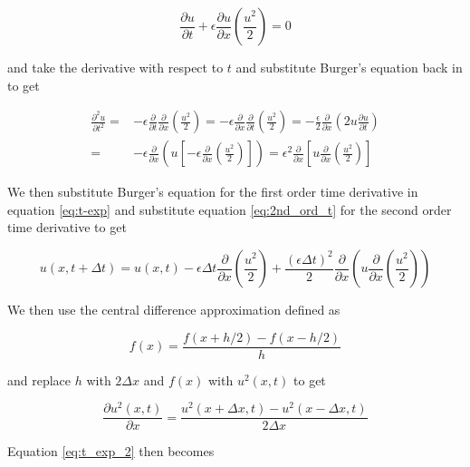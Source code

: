 \documentclass{article}
\begin{document}
\begin{equation}
	\frac{\partial u}{\partial t}+\epsilon \frac{\partial u}{\partial x} \left(\frac{u^2}{2}\right) = 0
\end{equation}

and take the derivative with respect to $t$  and substitute Burger's equation back in to get

\begin{equation}
\begin{split}
	\label{eq:2nd_ord_t}
	\frac{\partial^2 u }{\partial t^2} =& - \epsilon \frac{\partial }{\partial t}\frac{\partial }{\partial x} \left(\frac{u^2}{2} \right)
	= - \epsilon \frac{\partial }{\partial x}\frac{\partial }{\partial t} \left(\frac{u^2}{2} \right)
	= - \frac{\epsilon}{2} \frac{\partial }{\partial x}\left( 2u\frac{\partial u}{\partial t} \right)
	\\ =& - \epsilon \frac{\partial }{\partial x} \left( u \left[ -\epsilon \frac{\partial }{\partial x} \left(\frac{u^2}{2} \right) \right] \right)
	= \epsilon^2 \frac{\partial}{\partial x} \left[u \frac{\partial}{\partial x}\left( \frac{u^2}{2}\right) \right]
\end{split}
\end{equation}

We then substitute Burger's equation for the first order time derivative in equation \ref{eq:t-exp} and substitute equation \ref{eq:2nd_ord_t} for the second order time derivative to get

\begin{equation}
	\label{eq:t_exp_2}
	u(x,t+\Delta t) = u(x,t) - \epsilon \Delta t \frac{\partial }{\partial x} \left(\frac{u^2}{2}\right) + \frac{(\epsilon\Delta t)^2}{2}\frac{\partial}{\partial x }\left(u\frac{\partial}{\partial x}\left(\frac{u^2}{2}\right) \right)
\end{equation}

We then use the central difference approximation defined as 

\begin{equation}
	f(x) = \frac{f(x+h/2) - f(x-h/2)}{h}
\end{equation}

and replace $h$ with $2\Delta x$ and $f(x)$ with $u^2(x,t)$ to get 

\begin{equation}
	\frac{\partial u^2(x,t)}{\partial x} = \frac{u^2(x+\Delta x, t) - u^2(x-\Delta x, t)}{2\Delta x}
\end{equation}

Equation \ref{eq:t_exp_2} then becomes
\end{document}
